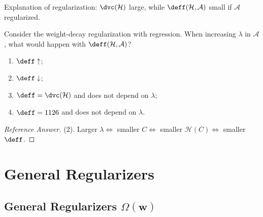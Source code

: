 \begin{moral}
    Explanation of regularization: \(\dvc(\mathcal{H})\) large, while
    \(\deff(\mathcal{H}, \mathcal{A})\) small if \(\mathcal{A}\) regularized.
\end{moral}

\begin{exercise}
    Consider the weight-decay regularization with regression. When increasing
    \(\lambda\) in \(\mathcal{A}\), what would happen with \(\deff(\mathcal{H},
    \mathcal{A})\)?
    \begin{enumerate}[(1)]
        \item \(\deff \uparrow\);
        \item \(\deff \downarrow\);
        \item \(\deff = \dvc(\mathcal{H})\) and does not depend on \(\lambda\);
        \item \(\deff = 1126\) and does not depend on \(\lambda\).
    \end{enumerate}
\end{exercise}

\begin{proof}[Reference Answer]
    (2). Larger \(\lambda \iff\) smaller \(C \iff\) smaller \(\mathcal{H}(C)
    \iff\) smaller \(\deff\).
\end{proof}

\section{General Regularizers}\label{sec:general-reg}


\subsection{General Regularizers \texorpdfstring{\(\Omega(\bm{w})\)}{Omega(w)}}

